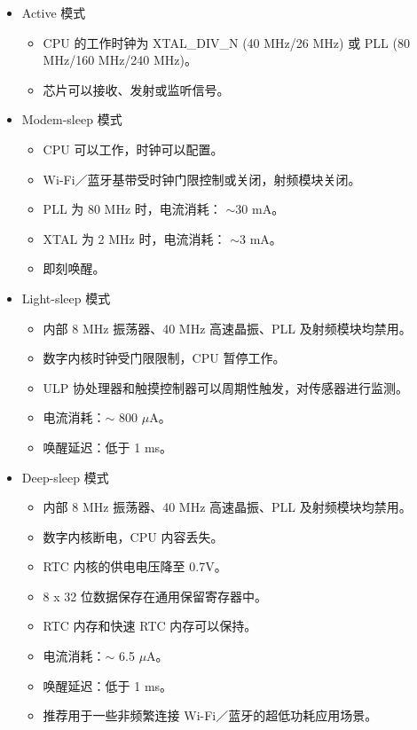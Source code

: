 \documentclass[main\_\_CN.tex]{subfiles}
\begin{document}
\begin{itemize}
    \item Active 模式
    \begin{itemize}
        \item CPU 的工作时钟为 XTAL\_DIV\_N (40 MHz/26 MHz) 或 PLL (80 MHz/160 MHz/240 MHz)。
        \item 芯片可以接收、发射或监听信号。
    \end{itemize}

    \item Modem-sleep 模式
    \begin{itemize}
        \item CPU 可以工作，时钟可以配置。
        \item Wi-Fi／蓝牙基带受时钟门限控制或关闭，射频模块关闭。
        \item PLL 为 80 MHz 时，电流消耗： $\sim$30 mA。
        \item XTAL 为 2 MHz 时，电流消耗： $\sim$3 mA。
        \item 即刻唤醒。
    \end{itemize}

    \item Light-sleep 模式
    \begin{itemize}
        \item 内部 8 MHz 振荡器、40 MHz 高速晶振、PLL 及射频模块均禁用。
        \item 数字内核时钟受门限限制，CPU 暂停工作。
        \item ULP 协处理器和触摸控制器可以周期性触发，对传感器进行监测。
        \item 电流消耗：$\sim$ 800 $\mu$A。
        \item 唤醒延迟：低于 1 ms。
    \end{itemize}

    \item Deep-sleep 模式
    \begin{itemize}
        \item 内部 8 MHz 振荡器、40 MHz 高速晶振、PLL 及射频模块均禁用。
        \item 数字内核断电，CPU 内容丢失。
        \item RTC 内核的供电电压降至 0.7V。
        \item 8 x 32 位数据保存在通用保留寄存器中。
        \item RTC 内存和快速 RTC 内存可以保持。
        \item 电流消耗：$\sim$ 6.5 $\mu$A。
        \item 唤醒延迟：低于 1 ms。
        \item 推荐用于一些非频繁连接 Wi-Fi／蓝牙的超低功耗应用场景。
    \end{itemize}


\end{itemize}
\end{document}
